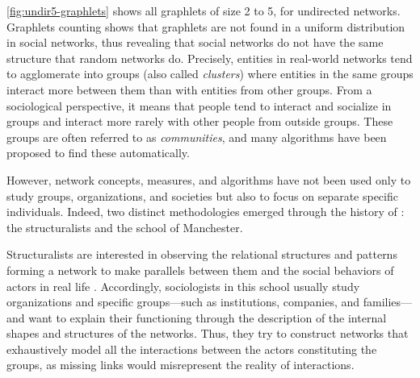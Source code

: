 \autoref{fig:undir5-graphlets} shows all graphlets of size 2 to 5, for undirected networks.
Graphlets counting shows that graphlets are not found in a uniform distribution in social networks\cite{charbeyStarsHolesPaths2019}, thus revealing that social networks do not have the same structure that random networks do.
Precisely, entities in real-world networks tend to agglomerate into groups (also called \emph{clusters}) where entities in the same groups interact more between them than with entities from other groups\cite{girvanCommunityStructureSocial2002}.
From a sociological perspective, it means that people tend to interact and socialize in groups and interact more rarely with other people from outside groups.
These groups are often referred to as \emph{communities}, and many algorithms have been proposed to find these automatically\cite{fortunatoCommunityDetectionGraphs2010}.

However, network concepts, measures, and algorithms have not been used only to study groups, organizations, and societies but also to focus on separate specific individuals.
Indeed, two distinct methodologies emerged through the history of \sna: the structuralists and the school of Manchester\cite{eveDeuxTraditionsAnalyse2002, maurizio2000, freemanDevelopmentSocialNetwork2004}.

Structuralists are interested in observing the relational structures and patterns forming a network to make parallels between them and the social behaviors of actors in real life \cite{lazegaReseaux}.
Accordingly, sociologists in this school usually study organizations and specific groups---such as institutions, companies, and families---and want to explain their functioning through the description of the internal shapes and structures of the networks.
Thus, they try to construct networks that exhaustively model all the interactions between the actors constituting the groups, as missing links would misrepresent the reality of interactions.

